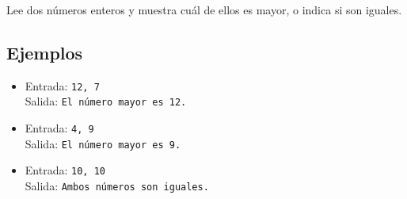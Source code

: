 Lee dos números enteros y muestra cuál de ellos es mayor, o indica si son iguales.
\subsection*{Ejemplos}
\begin{itemize}
    \item Entrada: \texttt{12, 7}\\
          Salida: \texttt{El número mayor es 12.}
    \item Entrada: \texttt{4, 9}\\
          Salida: \texttt{El número mayor es 9.}
    \item Entrada: \texttt{10, 10}\\
          Salida: \texttt{Ambos números son iguales.}
\end{itemize}